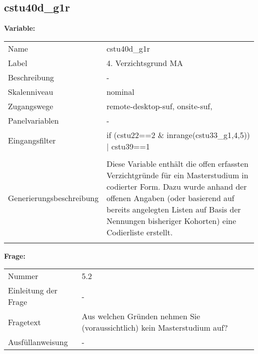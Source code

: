 	
	
	\subsection{cstu40d\_g1r}
	\label{subSection:cstu40d_g1r}

	\noindent\textbf{Variable:}\\
		\begin{tabular}{lL{11.3cm}}
			\label{tableVariable:cstu40d_g1r}
			Name & cstu40d\_g1r \\
			Label & 4. Verzichtsgrund MA \\
			Beschreibung & - \\
			Skalenniveau & nominal \\
			Zugangswege &
				remote-desktop-suf,
				onsite-suf,
 \\
			Panelvariablen & -
			 \\
			Eingangsfilter & if (cstu22==2 \& inrange(cstu33\_g1,4,5)) | cstu39==1 \\
 \\
					Generierungsbeschreibung & Diese Variable enthält die offen erfassten Verzichtgründe für ein Masterstudium in codierter Form. Dazu wurde anhand der offenen Angaben (oder basierend auf bereits angelegten Listen auf Basis der Nennungen bisheriger Kohorten) eine Codierliste erstellt.
				 \\	
			 \\
		\end{tabular}

		\vspace*{1 cm}
		\noindent\textbf{Frage:}\\
		\begin{tabular}{lL{11.3cm}}
			\label{tableQuestion:cstu40d_g1r}
			Nummer & 5.2 \\
			Einleitung der Frage & - \\
			Fragetext & Aus welchen Gründen nehmen Sie (voraussichtlich) kein Masterstudium auf? \\
			Ausfüllanweisung & - \\
		\end{tabular}





